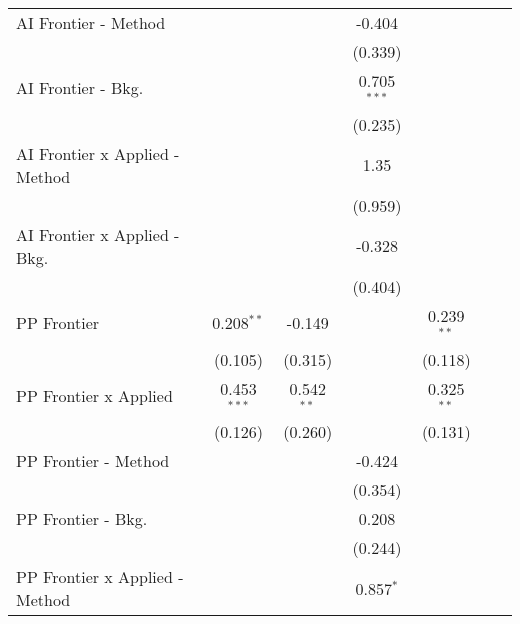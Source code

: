 \begin{tabular}{lcccccc}
   AI Frontier - Method           &               &              & -0.404        &               &        &   \\   
                                  &               &              & (0.339)       &               &        &   \\   
   AI Frontier - Bkg.             &               &              & 0.705$^{***}$ &               &        &   \\   
                                  &               &              & (0.235)       &               &        &   \\   
   AI Frontier x Applied - Method &               &              & 1.35          &               &        &   \\   
                                  &               &              & (0.959)       &               &        &   \\   
   AI Frontier x Applied - Bkg.   &               &              & -0.328        &               &        &   \\   
                                  &               &              & (0.404)       &               &        &   \\   
   PP Frontier                    & 0.208$^{**}$  & -0.149       &               & 0.239$^{**}$  &        &   \\   
                                  & (0.105)       & (0.315)      &               & (0.118)       &        &   \\   
   PP Frontier x Applied          & 0.453$^{***}$ & 0.542$^{**}$ &               & 0.325$^{**}$  &        &   \\   
                                  & (0.126)       & (0.260)      &               & (0.131)       &        &   \\   
   PP Frontier - Method           &               &              & -0.424        &               &        &   \\   
                                  &               &              & (0.354)       &               &        &   \\   
   PP Frontier - Bkg.             &               &              & 0.208         &               &        &   \\   
                                  &               &              & (0.244)       &               &        &   \\   
   PP Frontier x Applied - Method &               &              & 0.857$^{*}$   &               &        &   \\   

\end{tabular}
